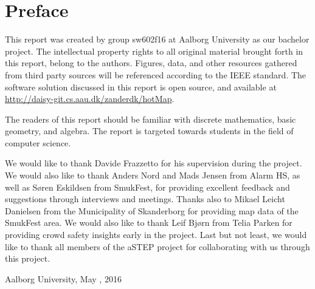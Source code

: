 \chapter*{Preface}\label{ch:preface}
This report was created by group sw602f16 at Aalborg University as our bachelor project. The intellectual property rights to all original material brought forth in this report, belong to the authors. Figures, data, and other resources gathered from third party sources will be referenced according to the IEEE standard. The software solution discussed in this report is open source, and available at \url{http://daisy-git.cs.aau.dk/zanderdk/hotMap}.

The readers of this report should be familiar with discrete mathematics, basic geometry, and algebra. The report is targeted towards students in the field of computer science.

We would like to thank Davide Frazzetto for his supervision during the project. We would also like to thank Anders Nord and Mads Jensen from Alarm HS, as well as Søren Eskildsen from SmukFest, for providing excellent feedback and suggestions through interviews and meetings. Thanks also to Mikael Leicht Danielsen from the Municipality of Skanderborg for providing map data of the SmukFest area. We would also like to thank Leif Bjørn from Telia Parken for providing crowd safety insights early in the project. Last but not least, we would like to thank all members of the aSTEP project for collaborating with us through this project.

\vspace{\baselineskip}\hfill Aalborg University, May , 2016
\vfill



